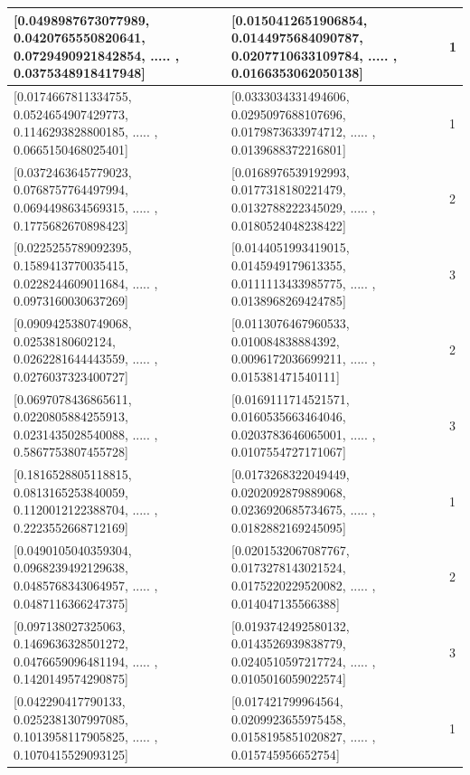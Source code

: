 \begin{table}[]
{\begin{tabular}{@{}|l|l|l|@{}}
      {[}0.0498987673077989, 0.0420765550820641, 0.0729490921842854, ..... , 0.0375348918417948{]}  & {[}0.0150412651906854, 0.0144975684090787, 0.0207710633109784, ..... , 0.0166353062050138{]}  & 1              \\ \midrule
      {[}0.0174667811334755, 0.0524654907429773, 0.1146293828800185, ..... , 0.0665150468025401{]}  & {[}0.0333034331494606, 0.0295097688107696, 0.0179873633974712, ..... , 0.0139688372216801{]}  & 1              \\ \midrule
      {[}0.0372463645779023, 0.0768757764497994, 0.0694498634569315, ..... , 0.1775682670898423{]}  & {[}0.0168976539192993, 0.0177318180221479, 0.0132788222345029, ..... , 0.0180524048238422{]}  & 2              \\ \midrule
      {[}0.0225255789092395, 0.1589413770035415, 0.0228244609011684, ..... , 0.0973160030637269{]}  & {[}0.0144051993419015, 0.0145949179613355, 0.0111113433985775, ..... , 0.0138968269424785{]}  & 3              \\ \midrule
      {[}0.0909425380749068, 0.02538180602124, 0.0262281644443559, ..... , 0.0276037323400727{]}    & {[}0.0113076467960533, 0.010084838884392, 0.0096172036699211, ..... , 0.015381471540111{]}    & 2              \\ \midrule
      {[}0.0697078436865611, 0.0220805884255913, 0.0231435028540088, ..... , 0.5867753807455728{]}  & {[}0.0169111714521571, 0.0160535663464046, 0.0203783646065001, ..... , 0.0107554727171067{]}  & 3              \\ \midrule
      {[}0.1816528805118815, 0.0813165253840059, 0.1120012122388704, ..... , 0.2223552668712169{]}  & {[}0.0173268322049449, 0.0202092879889068, 0.0236920685734675, ..... , 0.0182882169245095{]}  & 1              \\ \midrule
      {[}0.0490105040359304, 0.0968239492129638, 0.0485768343064957, ..... , 0.0487116366247375{]}  & {[}0.0201532067087767, 0.0173278143021524, 0.0175220229520082, ..... , 0.014047135566388{]}   & 2              \\ \midrule
      {[}0.097138027325063, 0.1469636328501272, 0.0476659096481194, ..... , 0.1420149574290875{]}   & {[}0.0193742492580132, 0.0143526939838779, 0.0240510597217724, ..... , 0.0105016059022574{]}  & 3              \\ \midrule
      {[}0.042290417790133, 0.0252381307997085, 0.1013958117905825, ..... , 0.1070415529093125{]}   & {[}0.017421799964564, 0.0209923655975458, 0.0158195851020827, ..... , 0.015745956652754{]}    & 1              \\ \midrule

\end{tabular}}
\end{table}
